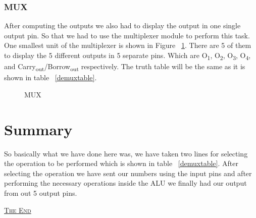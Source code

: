 \documentclass[a4paper, 12pt, twoside]{scrreprt}
\begin{document}
\subsection{MUX}
After computing the outputs we also had to display the output in one single output pin. So that we had to use the multiplexer module to perform this task. One smallest unit of the multiplexer is shown in Figure ~\ref{mux}. There are 5 of them to display the 5 different outputs in 5 separate pins. Which are O\textsubscript{1}, O\textsubscript{2}, O\textsubscript{3}, O\textsubscript{4}, and Carry\textsubscript{out}/Borrow\textsubscript{out} respectively. The truth table will be the same as it is shown in table ~\ref{demuxtable}.

\begin{center}
\begin{figure}[h]
\begin{center}
\end{center} 
\caption{MUX \label{mux}}
\end{figure}
\end{center}

\chapter{Summary}
\setcounter{page}{8}
So basically what we have done here was, we have taken two lines for selecting the operation to be performed which is shown in table ~\ref{demuxtable}. After selecting the operation we have sent our numbers using the input pins and after performing the necessary operations inside the ALU we finally had our output from out 5 output pins.

\begin{center}
\href{http://saumiko.github.io}{\textsc{The End}}
\end{center}
\end{document}
